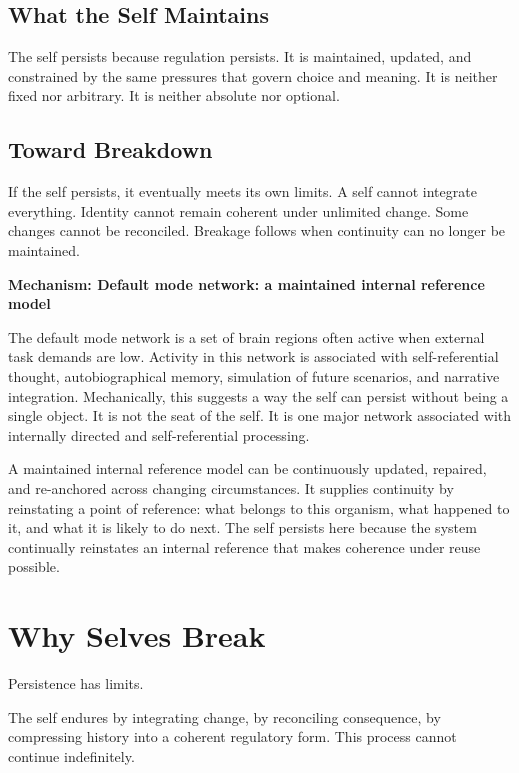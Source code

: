 \documentclass[11pt,twoside,openright]{book}
\newenvironment{mechanismbox}[1]
  {\begin{framed}\noindent\textbf{Mechanism: #1}\par\medskip}
  {\end{framed}}
\begin{document}
\section*{What the Self Maintains}

The self persists because regulation persists. It is maintained, updated, and constrained by the same pressures that govern choice and meaning. It is neither fixed nor arbitrary. It is neither absolute nor optional.

\section*{Toward Breakdown}

If the self persists, it eventually meets its own limits. A self cannot integrate everything. Identity cannot remain coherent under unlimited change. Some changes cannot be reconciled. Breakage follows when continuity can no longer be maintained.

\begin{mechanismbox}{Default mode network: a maintained internal reference model}

The default mode network is a set of brain regions often active when external task demands are low. Activity in this network is associated with self-referential thought, autobiographical memory, simulation of future scenarios, and narrative integration. Mechanically, this suggests a way the self can persist without being a single object. It is not the seat of the self. It is one major network associated with internally directed and self-referential processing.

A maintained internal reference model can be continuously updated, repaired, and re-anchored across changing circumstances. It supplies continuity by reinstating a point of reference: what belongs to this organism, what happened to it, and what it is likely to do next. The self persists here because the system continually reinstates an internal reference that makes coherence under reuse possible.

\end{mechanismbox}

\chapter{Why Selves Break}
\label{ch:selves_break}

Persistence has limits.

The self endures by integrating change, by reconciling consequence, by compressing history into a coherent regulatory form. This process cannot continue indefinitely.
\end{document}
